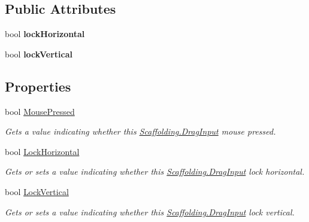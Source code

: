 \subsection*{Public Attributes}
\begin{DoxyCompactItemize}
\item 
\hypertarget{class_scaffolding_1_1_drag_input_a4f032b5cb00663f311d36154fb8e64a3}{bool {\bfseries lock\-Horizontal}}\label{class_scaffolding_1_1_drag_input_a4f032b5cb00663f311d36154fb8e64a3}

\item 
\hypertarget{class_scaffolding_1_1_drag_input_ab1eb142a4d7572c0c1cc36b2a50d7eee}{bool {\bfseries lock\-Vertical}}\label{class_scaffolding_1_1_drag_input_ab1eb142a4d7572c0c1cc36b2a50d7eee}

\end{DoxyCompactItemize}
\subsection*{Properties}
\begin{DoxyCompactItemize}
\item 
bool \hyperlink{class_scaffolding_1_1_drag_input_ab8e2d83d121fbd2b3ad60ef23fe5332f}{Mouse\-Pressed}
\begin{DoxyCompactList}\small\item\em Gets a value indicating whether this \hyperlink{class_scaffolding_1_1_drag_input}{Scaffolding.\-Drag\-Input} mouse pressed. \end{DoxyCompactList}\item 
bool \hyperlink{class_scaffolding_1_1_drag_input_ab13911d3778d99a0687b7bf724adb42d}{Lock\-Horizontal}
\begin{DoxyCompactList}\small\item\em Gets or sets a value indicating whether this \hyperlink{class_scaffolding_1_1_drag_input}{Scaffolding.\-Drag\-Input} lock horizontal. \end{DoxyCompactList}\item 
bool \hyperlink{class_scaffolding_1_1_drag_input_a5efcdda6db82447e4e61490c85977180}{Lock\-Vertical}
\begin{DoxyCompactList}\small\item\em Gets or sets a value indicating whether this \hyperlink{class_scaffolding_1_1_drag_input}{Scaffolding.\-Drag\-Input} lock vertical. \end{DoxyCompactList}\end{DoxyCompactItemize}



